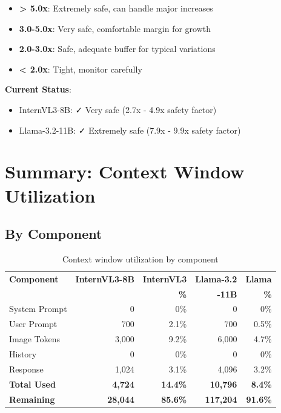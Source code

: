 \documentclass[11pt,a4paper]{article}
\newcommand{\cmark}{\textcolor{green!70!black}{✓}}
\begin{document}
\begin{itemize}[leftmargin=*]
    \item \textbf{> 5.0x}: Extremely safe, can handle major increases
    \item \textbf{3.0-5.0x}: Very safe, comfortable margin for growth
    \item \textbf{2.0-3.0x}: Safe, adequate buffer for typical variations
    \item \textbf{< 2.0x}: Tight, monitor carefully
\end{itemize}

\textbf{Current Status}:
\begin{itemize}[leftmargin=*]
    \item InternVL3-8B: \cmark{} Very safe (2.7x - 4.9x safety factor)
    \item Llama-3.2-11B: \cmark{} Extremely safe (7.9x - 9.9x safety factor)
\end{itemize}

\section{Summary: Context Window Utilization}

\subsection{By Component}

\begin{table}[h]
\centering
\small
\begin{tabular}{lrrrr}
\toprule
\textbf{Component} & \textbf{InternVL3-8B} & \textbf{InternVL3} & \textbf{Llama-3.2} & \textbf{Llama} \\
& & \textbf{\%} & \textbf{-11B} & \textbf{\%} \\
\midrule
System Prompt & 0 & 0\% & 0 & 0\% \\
User Prompt & 700 & 2.1\% & 700 & 0.5\% \\
Image Tokens & 3,000 & 9.2\% & 6,000 & 4.7\% \\
History & 0 & 0\% & 0 & 0\% \\
Response & 1,024 & 3.1\% & 4,096 & 3.2\% \\
\midrule
\textbf{Total Used} & \textbf{4,724} & \textbf{14.4\%} & \textbf{10,796} & \textbf{8.4\%} \\
\textbf{Remaining} & \textbf{28,044} & \textbf{85.6\%} & \textbf{117,204} & \textbf{91.6\%} \\
\bottomrule
\end{tabular}
\caption{Context window utilization by component}
\end{table}
\end{document}
